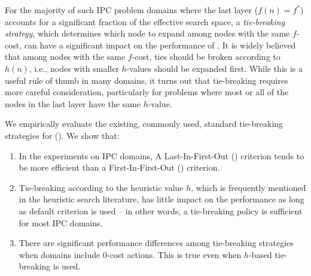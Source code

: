 For the majority of such IPC problem domains where
the last layer ($f(n)=f^*$) accounts for a significant fraction of the effective search space, a
\emph{tie-breaking strategy}, which determines which node to expand among nodes with the same $f$-cost,
can have a significant impact on the performance of \astar.
It is widely believed that among nodes with the same $f$-cost,
ties should be broken according to $h(n)$, i.e.,
nodes with smaller $h$-values should be expanded first.  While this is a
useful rule of thumb in many domains, it turns out that tie-breaking
requires more careful consideration, particularly for problems where
most or all of the nodes in the last layer have the same $h$-value.

We empirically evaluate the existing, commonly used, standard
tie-breaking strategies for \astar ().
We show that:

\begin{enumerate}
 \item In the experiments on IPC domains,
       A Last-In-First-Out (\lifo) criterion tends to be more efficient
       than a First-In-First-Out (\fifo) criterion.
 \item Tie-breaking according to the heuristic value $h$, which
       is frequently mentioned in the heuristic search literature, has little
       impact on the performance as long as \lifo default criterion is used 
       --  in other words, a \lifo tie-breaking policy is sufficient for most IPC domains.
 \item There are significant performance differences among tie-breaking strategies
       when domains include 0-cost actions. This is true even when $h$-based tie-breaking is used.
\end{enumerate}
